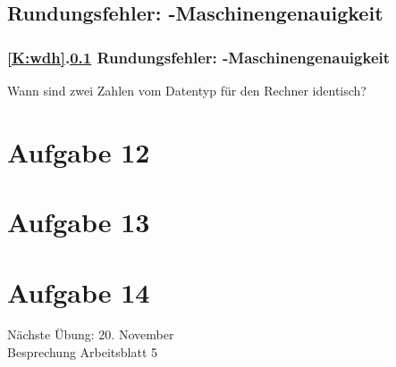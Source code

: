 \documentclass[9pt,german]{beamer}%
\begin{document}
\def\stitle{Rundungsfehler: -Maschinengenauigkeit}
\subsection{\stitle}\label{S:Maschinengenauigkeit1}
\begin{frame}[t]%
 \frametitle{\ref{K:wdh}.\ref{S:Maschinengenauigkeit1} \stitle}
\medskip

Wann sind zwei Zahlen vom Datentyp  f\"ur den Rechner identisch?


\end{frame}


\section{Aufgabe 12}

\section{Aufgabe 13}

\section{Aufgabe 14}


\begin{frame}
\centering
\Huge{}
\vspace{2cm}

{\LARGE
N\"achste \"Ubung: 20. November\\
Besprechung Arbeitsblatt 5
}
\end{frame}


\end{document}
